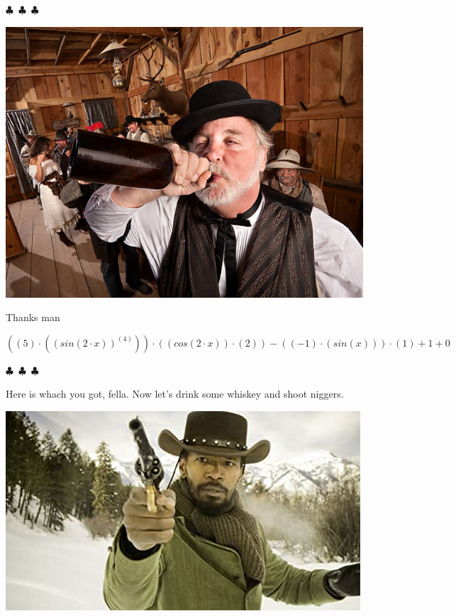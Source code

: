 \documentclass{article}
\begin{document}
\begin{center} $\clubsuit$~$\clubsuit$~$\clubsuit$ \end{center}\begin{center}  \includegraphics[scale=1.4]{funny_pics/drunk_cowboy.jpg} \end{center}Thanks man
\begin{center}$
{{{{{({{({5})}\cdot{({{({sin{({{2}\cdot{x}})}})}^{({4})}})}})}\cdot{({{({cos{({{2}\cdot{x}})}})}\cdot{({2})}})}}-{{({{({-1})}\cdot{({sin{({x})}})}})}\cdot{({1})}}}+{1}}+{0}}
$\end{center}
\begin{center} $\clubsuit$~$\clubsuit$~$\clubsuit$ \end{center}Here is whach you got, fella. Now let's drink some whiskey and shoot niggers.\begin{center} \includegraphics[scale=0.6]{funny_pics/slave.jpg} \end{center}
\end{document}
